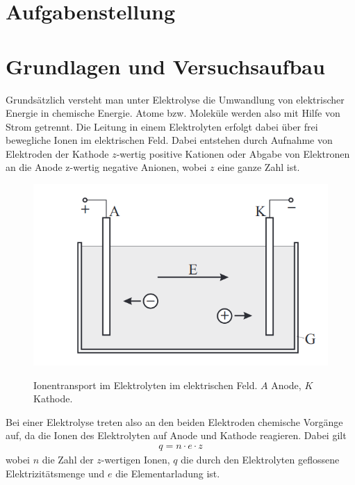 \documentclass{article}
\begin{document}
\parindent0cm




\pagestyle{fancy}

\section{Aufgabenstellung}






\section{Grundlagen und Versuchsaufbau}

Grundsätzlich versteht man unter Elektrolyse die Umwandlung von elektrischer Energie in chemische Energie. Atome bzw. Moleküle werden also mit Hilfe von Strom getrennt. Die Leitung in einem Elektrolyten erfolgt dabei über frei bewegliche Ionen im elektrischen Feld. Dabei entstehen durch Aufnahme von Elektroden der Kathode $z$-wertig positive Kationen oder Abgabe von Elektronen an die Anode z-wertig negative Anionen, wobei $z$ eine ganze Zahl ist.



\begin{figure}[H]
\caption{Ionentransport im Elektrolyten im elektrischen Feld. $A$ Anode, $K$ Kathode.}
\label{fig:pic1}
{\centering
\includegraphics[scale=1.8]{pic1.png}}
\end{figure}

Bei einer Elektrolyse treten also an den beiden Elektroden chemische Vorgänge auf, da die Ionen des Elektrolyten auf Anode und Kathode reagieren. Dabei gilt
\begin{align}
q = n\cdot e \cdot z
\end{align}
wobei $n$ die Zahl der $z$-wertigen Ionen, $q$ die durch den Elektrolyten geflossene Elektrizitätsmenge und $e$ die Elementarladung ist.
\end{document}
